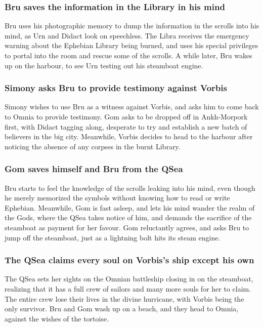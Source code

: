 \subsubsection{\Gls{Bru} saves the information in the Library in his mind}
\Gls{Bru} uses his photographic memory to dump the information in the scrolls into his mind, as
\Gls{Urn} and \Gls{Didact} look on speechless. The \Gls{Libra} receives the emergency warning about
the Ephebian Library being burned, and uses his special privileges to portal into the room and
rescue some of the scrolls. A while later, \Gls{Bru} wakes up on the harbour, to see \Gls{Urn}
testing out his steamboat engine.

\subsubsection{\Gls{Simony} asks \Gls{Bru} to provide testimony against \Gls{Vorbis}}
\Gls{Simony} wishes to use \Gls{Bru} as a witness against \Gls{Vorbis}, and asks him to come back to
Omnia to provide testimony. \Gls{Gom} asks to be dropped off in Ankh-Morpork first, with
\Gls{Didact} tagging along, desperate to try and establish a new batch of believers in the big
city. Meanwhile, \Gls{Vorbis} decides to head to the harbour after noticing the absence of any
corpses in the burnt Library.

\subsubsection{\Gls{Gom} saves himself and \Gls{Bru} from the \Gls{QSea}}
\Gls{Bru} starts to feel the knowledge of the scrolls leaking into his mind, even though he merely
memorized the symbols without knowing how to read or write Ephebian. Meanwhile, \Gls{Gom} is fast
asleep, and lets his mind wander the realm of the Gods, where the \Gls{QSea} takes notice of him,
and demands the sacrifice of the steamboat as payment for her favour. \Gls{Gom} reluctantly agrees,
and asks \Gls{Bru} to jump off the steamboat, just as a lightning bolt hits its steam engine.

\subsubsection{The \Gls{QSea} claims every soul on \Gls{Vorbis}'s ship except his own}
The \Gls{QSea} sets her sights on the Omnian battleship closing in on the steamboat, realizing that
it has a full crew of sailors and many more souls for her to claim. The entire crew lose their lives
in the divine hurricane, with \Gls{Vorbis} being the only survivor. \Gls{Bru} and \Gls{Gom} wash
up on a beach, and they head to Omnia, against the wishes of the tortoise.

